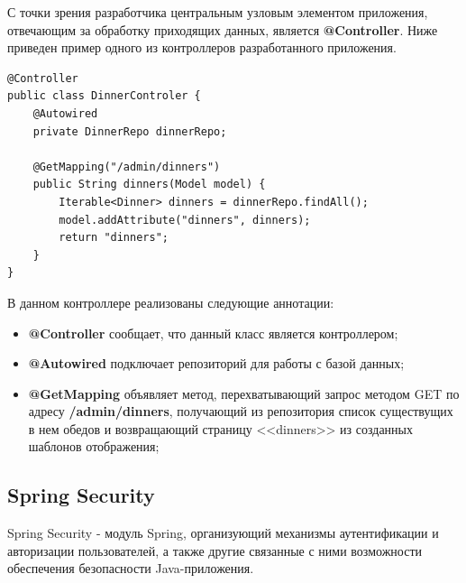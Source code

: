 \documentclass[a4paper]{article}
\begin{document}
С точки зрения разработчика центральным узловым элементом приложения, отвечающим за обработку приходящих данных, является \textbf{@Controller}. Ниже приведен пример одного из контроллеров разработанного приложения.
\hfill\break
{}         
\begin{lstlisting}[label=lis7,caption=@Controller] 
@Controller
public class DinnerControler {
    @Autowired
    private DinnerRepo dinnerRepo;

    @GetMapping("/admin/dinners")
    public String dinners(Model model) {
        Iterable<Dinner> dinners = dinnerRepo.findAll();
        model.addAttribute("dinners", dinners);
        return "dinners";
    }
}
\end{lstlisting}

В данном контроллере реализованы следующие аннотации:

\begin{itemize}
\setlength{\itemsep}{-2mm}
	\item\textbf{@Controller} сообщает, что данный класс является контроллером;
	\item\textbf{@Autowired} подключает репозиторий для работы с базой данных;
	\item\textbf{@GetMapping} объявляет метод, перехватывающий запрос методом GET по адресу \textbf{/admin/dinners}, получающий из репозитория список существущих в нем обедов и возвращающий страницу <<dinners>> из созданных шаблонов отображения;
\end{itemize}

\subsection{Spring Security}

Spring Security - модуль Spring, организующий механизмы аутентификации и авторизации пользователей, а также другие связанные с ними возможности обеспечения безопасности Java-приложения.
\end{document}
